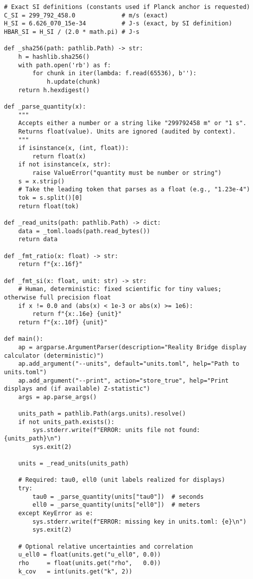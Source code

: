 \documentclass[11pt]{article}
\begin{document}
\begin{proposition}
\begin{verbatim}
# Exact SI definitions (constants used if Planck anchor is requested)
C_SI = 299_792_458.0             # m/s (exact)
H_SI = 6.626_070_15e-34          # J·s (exact, by SI definition)
HBAR_SI = H_SI / (2.0 * math.pi) # J·s

def _sha256(path: pathlib.Path) -> str:
    h = hashlib.sha256()
    with path.open('rb') as f:
        for chunk in iter(lambda: f.read(65536), b''):
            h.update(chunk)
    return h.hexdigest()

def _parse_quantity(x):
    """
    Accepts either a number or a string like "299792458 m" or "1 s".
    Returns float(value). Units are ignored (audited by context).
    """
    if isinstance(x, (int, float)):
        return float(x)
    if not isinstance(x, str):
        raise ValueError("quantity must be number or string")
    s = x.strip()
    # Take the leading token that parses as a float (e.g., "1.23e-4")
    tok = s.split()[0]
    return float(tok)

def _read_units(path: pathlib.Path) -> dict:
    data = _toml.loads(path.read_bytes())
    return data

def _fmt_ratio(x: float) -> str:
    return f"{x:.16f}"

def _fmt_si(x: float, unit: str) -> str:
    # Human, deterministic: fixed scientific for tiny values; otherwise full precision float
    if x != 0.0 and (abs(x) < 1e-3 or abs(x) >= 1e6):
        return f"{x:.16e} {unit}"
    return f"{x:.10f} {unit}"

def main():
    ap = argparse.ArgumentParser(description="Reality Bridge display calculator (deterministic)")
    ap.add_argument("--units", default="units.toml", help="Path to units.toml")
    ap.add_argument("--print", action="store_true", help="Print displays and (if available) Z-statistic")
    args = ap.parse_args()

    units_path = pathlib.Path(args.units).resolve()
    if not units_path.exists():
        sys.stderr.write(f"ERROR: units file not found: {units_path}\n")
        sys.exit(2)

    units = _read_units(units_path)

    # Required: tau0, ell0 (unit labels realized for displays)
    try:
        tau0 = _parse_quantity(units["tau0"])  # seconds
        ell0 = _parse_quantity(units["ell0"])  # meters
    except KeyError as e:
        sys.stderr.write(f"ERROR: missing key in units.toml: {e}\n")
        sys.exit(2)

    # Optional relative uncertainties and correlation
    u_ell0 = float(units.get("u_ell0", 0.0))
    rho     = float(units.get("rho",   0.0))
    k_cov   = int(units.get("k", 2))


\end{verbatim}
\end{proposition}
\end{document}
